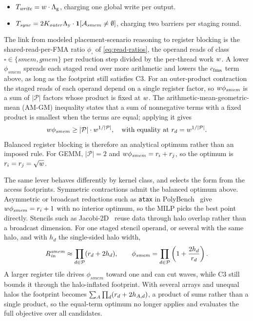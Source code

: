 \begin{itemize}
  \item \(T_{\mathit{write}}=w\cdot \Lambda_{\mathrm g}\), charging one global write per output.
  \item \(T_{\mathit{sync}}=2K_{\mathit{outer}}\Lambda_{\mathrm y}\cdot\mathbf{1}[\mathcal{A}_{\mathit{smem}}\ne\emptyset]\), charging two barriers per staging round.
\end{itemize}

The link from modeled placement-scenario reasoning to register blocking is the shared-read-per-FMA ratio \(\phi_{\square}\) of \autoref{eq:read-ratios}, the operand reads of class \(\square\in\{\mathit{smem},\mathit{gmem}\}\) per reduction step divided by the per-thread work \(w\). A lower \(\phi_{\mathit{smem}}\) spreads each staged read over more arithmetic and lowers the \(c_{\mathrm{fma}}\) term above, as long as the footprint still satisfies C3. For an outer-product contraction the staged reads of each operand depend on a single register factor, so \(w\phi_{\mathit{smem}}\) is a sum of \(|\mathcal{P}|\) factors whose product is fixed at \(w\). The arithmetic-mean-geometric-mean (AM-GM) inequality states that a sum of nonnegative terms with a fixed product is smallest when the terms are equal; applying it gives
\[
w\phi_{\mathit{smem}} \ge |\mathcal{P}| \cdot w^{1/|\mathcal{P}|},
\quad \text{with equality at } r_d=w^{1/|\mathcal{P}|}.
\]
Balanced register blocking is therefore an analytical optimum rather than an imposed rule. For GEMM, \(|\mathcal{P}|=2\) and \(w\phi_{\mathit{smem}}=r_i+r_j\), so the optimum is \(r_i=r_j=\sqrt{w}\).

The same lever behaves differently by kernel class, and \name selects the form from the access footprints. Symmetric contractions admit the balanced optimum above. Asymmetric or broadcast reductions such as \texttt{atax} in PolyBench~\cite{polybench} give \(w\phi_{\mathit{smem}}=r_i+1\) with no interior optimum, so the MILP picks the best point directly. Stencils such as Jacobi-2D~\cite{polybench} reuse data through halo overlap rather than a broadcast dimension. For one staged stencil operand, or several with the same halo, and with \(h_d\) the single-sided halo width,
\begin{equation}
\begin{aligned}
R^{\mathit{smem}}_{\mathit{in}}
\approx \prod_{d\in\mathcal{P}}(r_d+2h_d),
\qquad
\phi_{\mathit{smem}}
= \prod_{d\in\mathcal{P}}\left(1+\frac{2h_d}{r_d}\right).
\end{aligned}
\label{eq:stencil-halo}
\end{equation}
A larger register tile drives \(\phi_{\mathit{smem}}\) toward one and can cut waves, while C3 still bounds it through the halo-inflated footprint. With several arrays and unequal halos the footprint becomes \(\sum_A\prod_d(r_d+2h_{A,d})\), a product of sums rather than a single product, so the equal-term optimum no longer applies and \name evaluates the full objective over all candidates.

